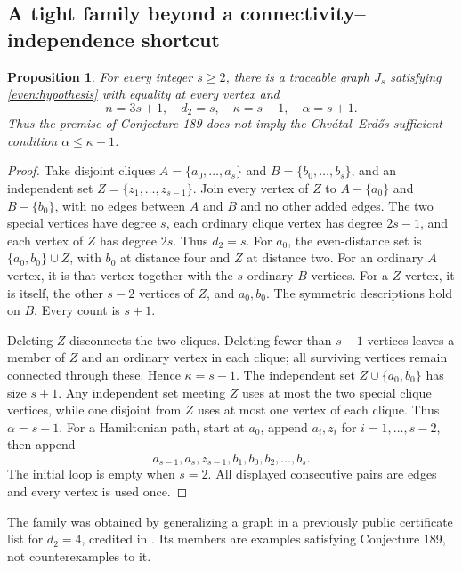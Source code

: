 \documentclass[11pt,a4paper]{article}
\newtheorem{proposition}[theorem]{Proposition}
\theoremstyle{definition}\newtheorem{definition}[theorem]{Definition}
\theoremstyle{remark}\newtheorem{remark}[theorem]{Remark}
\begin{document}
\subsection{A tight family beyond a connectivity--independence shortcut}
\begin{proposition}\label{even:js}
For every integer $s\ge2$, there is a traceable graph $J_s$ satisfying
\eqref{even:hypothesis} with equality at every vertex and
\[
 n=3s+1,\quad d_2=s,\quad \kappa=s-1,\quad \alpha=s+1.
\]
Thus the premise of Conjecture 189 does not imply the
Chv\'atal--Erd\H{o}s sufficient condition $\alpha\le\kappa+1$.
\end{proposition}
\begin{proof}
Take disjoint cliques $A=\{a_0,\ldots,a_s\}$ and
$B=\{b_0,\ldots,b_s\}$, and an independent set
$Z=\{z_1,\ldots,z_{s-1}\}$. Join every vertex of $Z$ to
$A-\{a_0\}$ and $B-\{b_0\}$, with no edges between $A$ and $B$
and no other added edges.
The two special vertices have degree $s$, each ordinary clique
vertex has degree $2s-1$, and each vertex of $Z$ has degree $2s$.
Thus $d_2=s$.
For $a_0$, the even-distance set is $\{a_0,b_0\}\cup Z$, with
$b_0$ at distance four and $Z$ at distance two. For an ordinary
$A$ vertex, it is that vertex together with the $s$ ordinary
$B$ vertices. For a $Z$ vertex, it is itself, the other $s-2$
vertices of $Z$, and $a_0,b_0$. The symmetric descriptions hold on
$B$. Every count is $s+1$.

Deleting $Z$ disconnects the two cliques. Deleting fewer than $s-1$
vertices leaves a member of $Z$ and an ordinary vertex in each clique;
all surviving vertices remain connected through these. Hence
$\kappa=s-1$. The independent set $Z\cup\{a_0,b_0\}$ has size $s+1$.
Any independent set meeting $Z$ uses at most the two special clique
vertices, while one disjoint from $Z$ uses at most one vertex of each
clique. Thus $\alpha=s+1$.
For a Hamiltonian path, start at $a_0$, append $a_i,z_i$ for
$i=1,\ldots,s-2$, then append
\[
 a_{s-1},a_s,z_{s-1},b_1,b_0,b_2,\ldots,b_s.
\]
The initial loop is empty when $s=2$. All displayed consecutive pairs
are edges and every vertex is used once.
\end{proof}
The family was obtained by generalizing a graph in a previously public
certificate list for $d_2=4$, credited in \cite{even:pr70}. Its members
are examples satisfying Conjecture 189, not counterexamples to it.
\end{document}
